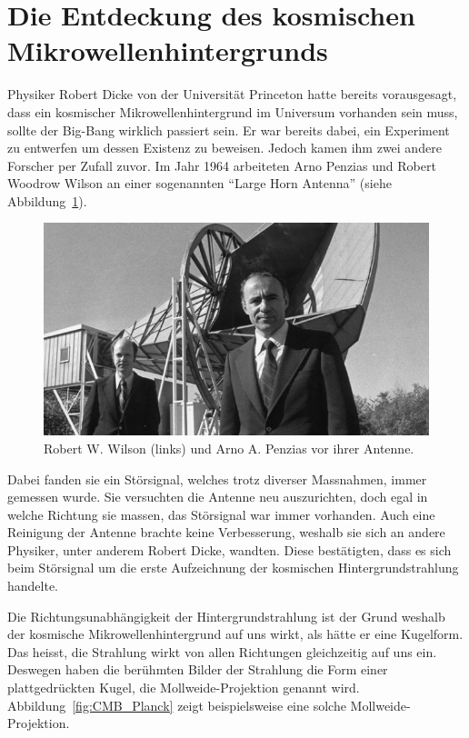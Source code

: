 \section{Die Entdeckung des kosmischen Mikrowellenhintergrunds}
Physiker Robert Dicke von der Universität Princeton hatte bereits vorausgesagt, 
dass ein kosmischer Mikrowellenhintergrund im Universum vorhanden sein muss, 
sollte der Big-Bang wirklich passiert sein. Er war bereits dabei, ein 
Experiment zu entwerfen um dessen Existenz zu beweisen. Jedoch kamen ihm zwei 
andere Forscher per Zufall zuvor.
Im Jahr 1964 arbeiteten Arno Penzias und Robert Woodrow Wilson an einer 
sogenannten ``Large Horn Antenna'' (siehe Abbildung~\ref{fig:wilson_penzias}).
\begin{figure}
	\centering
	\includegraphics[width=\linewidth]{cmb/images/penzias-wilson-large-horn-antenna.jpg}
	\caption{Robert W. Wilson (links) und Arno A. Penzias vor ihrer Antenne.}
	\label{fig:wilson_penzias}
\end{figure}
Dabei fanden sie ein Störsignal, welches trotz diverser Massnahmen, immer 
gemessen wurde.
Sie versuchten die Antenne neu auszurichten, doch egal in welche Richtung sie 
massen, das Störsignal war immer vorhanden.
Auch eine Reinigung der Antenne brachte keine Verbesserung, weshalb sie sich an 
andere Physiker, unter anderem Robert Dicke, wandten. Diese bestätigten, dass 
es sich beim Störsignal um die erste Aufzeichnung der kosmischen 
Hintergrundstrahlung handelte.

Die Richtungsunabhängigkeit der Hintergrundstrahlung ist der Grund weshalb der 
kosmische Mikrowellenhintergrund auf uns wirkt, als hätte er eine Kugelform. 
Das heisst, die Strahlung wirkt von allen Richtungen gleichzeitig auf uns ein.
Deswegen haben die berühmten Bilder der Strahlung die Form einer 
plattgedrückten Kugel, die Mollweide-Projektion genannt wird. 
Abbildung~\ref{fig:CMB_Planck} zeigt beispielsweise eine solche 
Mollweide-Projektion.

